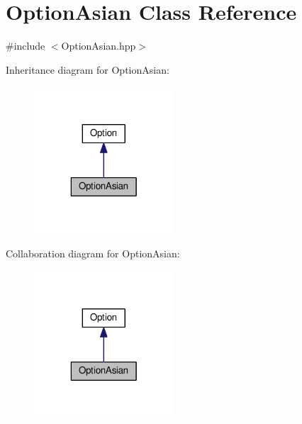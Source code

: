 \hypertarget{classOptionAsian}{\section{Option\-Asian Class Reference}
\label{classOptionAsian}
}


{\ttfamily \#include $<$Option\-Asian.\-hpp$>$}



Inheritance diagram for Option\-Asian\-:\nopagebreak
\begin{figure}[H]
\begin{center}
\leavevmode
\includegraphics[width=148pt]{classOptionAsian__inherit__graph}
\end{center}
\end{figure}


Collaboration diagram for Option\-Asian\-:\nopagebreak
\begin{figure}[H]
\begin{center}
\leavevmode
\includegraphics[width=148pt]{classOptionAsian__coll__graph}
\end{center}
\end{figure}
